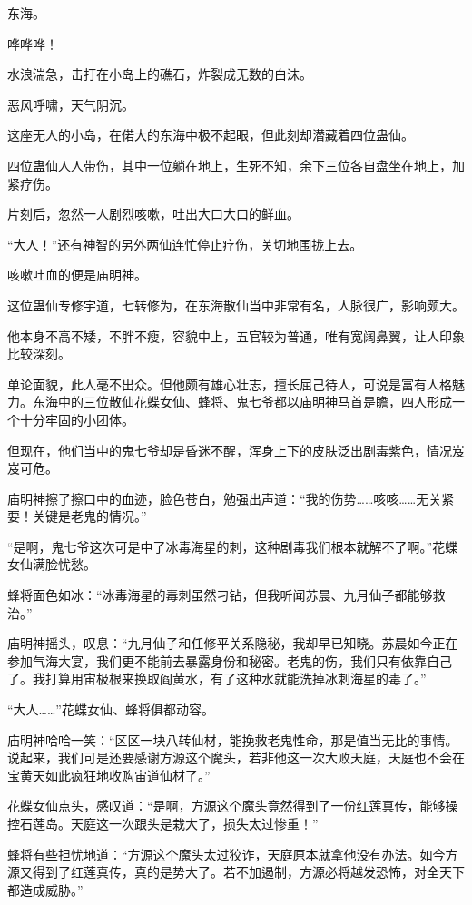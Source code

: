 
\begin{this_body}

东海。

哗哗哗！

水浪湍急，击打在小岛上的礁石，炸裂成无数的白沫。

恶风呼啸，天气阴沉。

这座无人的小岛，在偌大的东海中极不起眼，但此刻却潜藏着四位蛊仙。

四位蛊仙人人带伤，其中一位躺在地上，生死不知，余下三位各自盘坐在地上，加紧疗伤。

片刻后，忽然一人剧烈咳嗽，吐出大口大口的鲜血。

“大人！”还有神智的另外两仙连忙停止疗伤，关切地围拢上去。

咳嗽吐血的便是庙明神。

这位蛊仙专修宇道，七转修为，在东海散仙当中非常有名，人脉很广，影响颇大。

他本身不高不矮，不胖不瘦，容貌中上，五官较为普通，唯有宽阔鼻翼，让人印象比较深刻。

单论面貌，此人毫不出众。但他颇有雄心壮志，擅长屈己待人，可说是富有人格魅力。东海中的三位散仙花蝶女仙、蜂将、鬼七爷都以庙明神马首是瞻，四人形成一个十分牢固的小团体。

但现在，他们当中的鬼七爷却是昏迷不醒，浑身上下的皮肤泛出剧毒紫色，情况岌岌可危。

庙明神擦了擦口中的血迹，脸色苍白，勉强出声道：“我的伤势……咳咳……无关紧要！关键是老鬼的情况。”

“是啊，鬼七爷这次可是中了冰毒海星的刺，这种剧毒我们根本就解不了啊。”花蝶女仙满脸忧愁。

蜂将面色如冰：“冰毒海星的毒刺虽然刁钻，但我听闻苏晨、九月仙子都能够救治。”

庙明神摇头，叹息：“九月仙子和任修平关系隐秘，我却早已知晓。苏晨如今正在参加气海大宴，我们更不能前去暴露身份和秘密。老鬼的伤，我们只有依靠自己了。我打算用宙极根来换取阎黄水，有了这种水就能洗掉冰刺海星的毒了。”

“大人……”花蝶女仙、蜂将俱都动容。

庙明神哈哈一笑：“区区一块八转仙材，能挽救老鬼性命，那是值当无比的事情。说起来，我们可是还要感谢方源这个魔头，若非他这一次大败天庭，天庭也不会在宝黄天如此疯狂地收购宙道仙材了。”

花蝶女仙点头，感叹道：“是啊，方源这个魔头竟然得到了一份红莲真传，能够操控石莲岛。天庭这一次跟头是栽大了，损失太过惨重！”

蜂将有些担忧地道：“方源这个魔头太过狡诈，天庭原本就拿他没有办法。如今方源又得到了红莲真传，真的是势大了。若不加遏制，方源必将越发恐怖，对全天下都造成威胁。”


\end{this_body}
